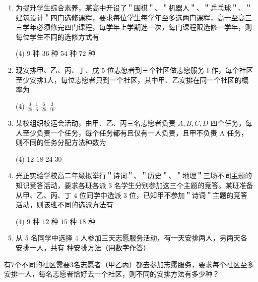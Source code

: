 \begin{enumerate}
    \item 为提升学生综合素养，某高中开设了＂围棋＂、＂机器人＂、＂乒乓球＂、＂建筑设计＂四门选修课程，要求每位学生每学年至多选两门课程，高一至高三三学年必须修完四门课程，每学年上学期选一次，每门课程限选修一学年，则每位学生不同的选修方式有
          \begin{tasks}(4)
              \task $9$ 种
              \task $36$ 种
              \task $54$ 种
              \task $72$ 种
          \end{tasks}


    \item 现安排甲、乙、丙、丁、戊 5 位志愿者到三个社区做志愿服务工作，每个社区至少安排1人，每位志愿者只到一个社区，其中甲、乙安排在同一个社区的概率为
          \begin{tasks}(4)
              \task $\frac{3}{25}$
              \task $\frac{1}{5}$
              \task $\frac{6}{25}$
              \task $\frac{3}{10}$
          \end{tasks}

    \item 某校组织校运会活动，由甲、乙、丙三名志愿者负责 $A, B, C, D$ 四个任务，每人至少负责一个任务，每个任务都有且仅有一人负责，且甲不负责 A 任务，则不同的任务分配方法种数为
          \begin{tasks}(4)
              \task $12$
              \task $18$
              \task $24$
              \task $30$
          \end{tasks}

    \item 光正实验学校高二年级拟举行＂诗词＂、＂历史＂、＂地理＂三场不同主题的知识竞答活动，要求各班各派 3 名学生分别参加这三个主题的竞答。某班准备从甲、乙、丙、丁 4 位同学中选派 3 位，已知甲不参加＂诗词＂主题的竞答活动，则该班不同的选派方法有
          \begin{tasks}(4)
              \task $9$ 种
              \task $12$ 种
              \task $15$ 种
              \task $18$ 种
          \end{tasks}

    \item 从 5 名同学中选择 4 人参加三天志愿服务活动，有一天安排两人，另两天各安排一人，共有 \underline{\hspace{2cm}}种安排方法（用数字作答）
\end{enumerate}

\begin{example}
    有7个不同的社区需要3名志愿者（甲乙丙）都去参加志愿服务，要求每个社区至多安排一人，每名志愿者恰好去一个社区，则不同的安排方法有多少种？
\end{example}

